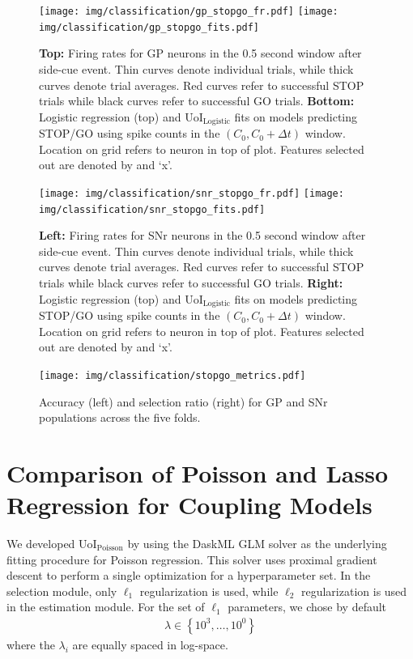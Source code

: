 \documentclass[11pt]{article}
\begin{document}
\begin{figure}[H]
	\centering
	\texttt{[image: img/classification/gp\_stopgo\_fr.pdf]}
	\texttt{[image: img/classification/gp\_stopgo\_fits.pdf]}
	\caption{\textbf{Top:} Firing rates for GP neurons in the 0.5 second window after side-cue event. Thin curves denote individual trials, while thick curves denote trial averages. Red curves refer to successful STOP trials while black curves refer to successful GO trials. \textbf{Bottom:} Logistic regression (top) and UoI$_{\text{Logistic}}$ fits on models predicting STOP/GO using spike counts in the $(C_0, C_0+\Delta t)$ window. Location on grid refers to neuron in top of plot. Features selected out are denoted by and `x'.}
	\label{fig:gp_stopgo}
\end{figure}

\begin{figure}[H]
	\centering
	\texttt{[image: img/classification/snr\_stopgo\_fr.pdf]}
	\texttt{[image: img/classification/snr\_stopgo\_fits.pdf]}
	\caption{\textbf{Left:} Firing rates for SNr neurons in the 0.5 second window after side-cue event. Thin curves denote individual trials, while thick curves denote trial averages. Red curves refer to successful STOP trials while black curves refer to successful GO trials. \textbf{Right:} Logistic regression (top) and UoI$_{\text{Logistic}}$ fits on models predicting STOP/GO using spike counts in the $(C_0, C_0+\Delta t)$ window. Location on grid refers to neuron in top of plot. Features selected out are denoted by and `x'.}
	\label{fig:snr_stopgo}
\end{figure}
\begin{figure}[H]
	\centering
	\texttt{[image: img/classification/stopgo\_metrics.pdf]}
	\caption{Accuracy (left) and selection ratio (right) for GP and SNr populations across the five folds.}
	\label{fig:stopgo_metrics}
\end{figure}
\section{Comparison of Poisson and Lasso Regression for Coupling Models}
We developed UoI$_{\text{Poisson}}$ by using the DaskML GLM solver as the underlying fitting procedure for Poisson regression. This solver uses proximal gradient descent to perform a single optimization for a hyperparameter set. In the selection module, only $\ell_1$ regularization is used, while $\ell_2$ regularization is used in the estimation module. For the set of $\ell_1$ parameters, we chose by default 
\begin{align}
\lambda \in \left\{10^{3}, \ldots, 10^{0}\right\}
\end{align}
where the $\lambda_i$ are equally spaced in log-space.
\end{document}
